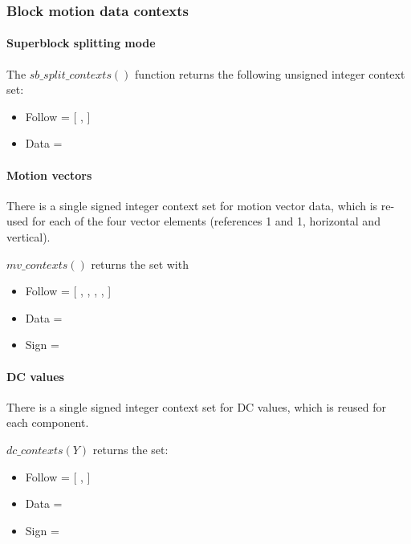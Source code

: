 \subsubsection{Block motion data contexts}

\paragraph{Superblock splitting mode\\}

The $sb\_split\_contexts()$ function returns the following unsigned integer context set:

\begin{itemize}
\item Follow = [ \SBSplitFollowOne, \SBSplitFollowTwo ]
\item Data = \SBSplitData
\end{itemize}

\paragraph{Motion vectors\\}
\label{mvcontexts}

There is a single signed integer context set for motion vector data, which is re-used for each of the four vector elements
(references 1 and 1, horizontal and vertical).

$mv\_contexts()$ returns the set with
\begin{itemize}
\item Follow = [ \VectorFollowOne, \VectorFollowTwo, \VectorFollowThree, \VectorFollowFour, \VectorFollowFivePlus ]
\item Data = \VectorData
\item Sign = \VectorSign
\end{itemize}

\paragraph{DC values \\}
\label{dcvaluecontexts}

There is a single signed integer context set for DC values, which is reused for each component. 

$dc\_contexts(Y)$ returns the set:

\begin{itemize}
\item Follow = [ \DCFollowOne, \DCFollowTwoPlus ]
\item Data = \DCData
\item Sign = \DCSign
\end{itemize}

